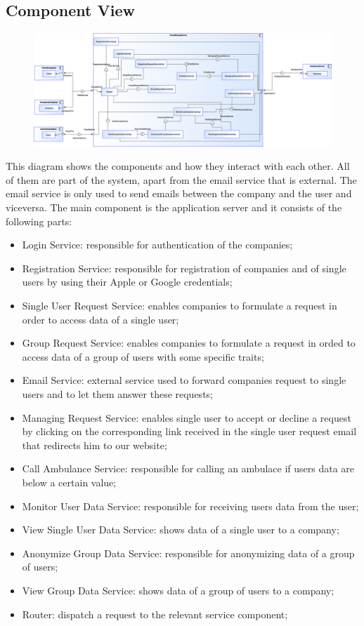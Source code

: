 \documentclass{article}
\begin{document}
\subsection{Component View}
\begin{figure}[h!]
\centering
    \textbf{}\par\medskip
	\includegraphics[width= \linewidth]{comp.png}
\end{figure}
This diagram shows the components and how they interact with each other. All of them are part of the system, apart from the email service that is external. The email service is only used to send emails between the company and the user and viceversa. \newline
The main component is the application server and it consists of the following parts:
\begin{itemize}
\item Login Service: responsible for authentication of the companies;
\item Registration Service: responsible for registration of companies and of single users by using their Apple or Google credentials;
\item Single User Request Service: enables companies to formulate a request in order to access data of a single user;
\item Group Request Service: enables companies to formulate a request in orded to access data of a group of users with some specific traits;
\item Email Service: external service used to forward companies request to single users and to let them answer these requests;
\item Managing Request Service: enables single user to accept or decline a request by clicking on the corresponding link received in the single user request email that redirects him to our website;
\item Call Ambulance Service: responsible for calling an ambulace if users data are below a certain value;
\item Monitor User Data Service: responsible for receiving users data from the user;
\item View Single User Data Service: shows data of a single user to a company;
\item Anonymize Group Data Service: responsible for anonymizing data of a group of users;
\item View Group Data Service: shows data of a group of users to a company;
\item Router: dispatch a request to the relevant service component;
\end{itemize}
\end{document}

